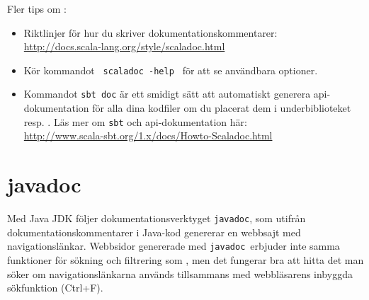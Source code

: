 Fler tips om \scaladoc:
\begin{itemize}%


\item
Riktlinjer för hur du skriver dokumentationskommentarer: \\
\url{http://docs.scala-lang.org/style/scaladoc.html}

%
%
%

\item Kör kommandot \texttt{ scaladoc -help } för att se användbara optioner.

\item Kommandot \texttt{sbt doc} är ett smidigt sätt att automatiskt generera api-dokumentation för alla dina kodfiler om du placerat dem i underbiblioteket  resp. .
Läs mer om \texttt{sbt} och api-dokumentation här: \\
\url{http://www.scala-sbt.org/1.x/docs/Howto-Scaladoc.html}


\end{itemize}

\clearpage

\section{javadoc}
\newcommand{\javadoc}{\texttt{javadoc}}


Med Java JDK följer dokumentationsverktyget \javadoc, som utifrån dokumentationskommentarer i Java-kod genererar en webbsajt med navigationslänkar. Webbsidor genererade med \javadoc\ erbjuder inte samma funktioner för sökning och filtrering som \scaladoc, men det fungerar bra att hitta det man söker om navigationslänkarna används tillsammans med webbläsarens inbyggda sökfunktion (Ctrl+F).

